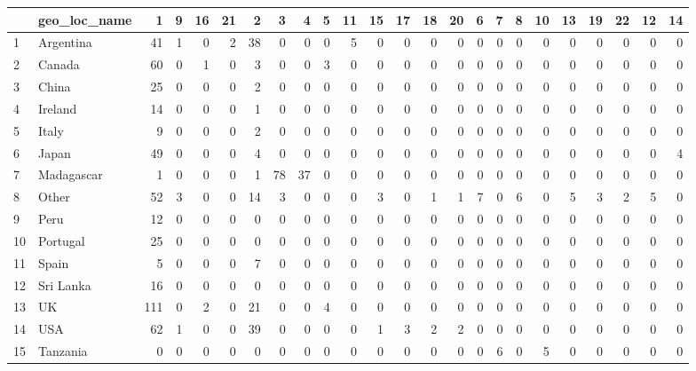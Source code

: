 \begin{table}[ht]
\centering
\begin{tabular}{llrrrrrrrrrrrrrrrrrrrrrr}
  \hline
 & geo\_loc\_name & 1 & 9 & 16 & 21 & 2 & 3 & 4 & 5 & 11 & 15 & 17 & 18 & 20 & 6 & 7 & 8 & 10 & 13 & 19 & 22 & 12 & 14 \\ 
  \hline
1 & Argentina & 41 & 1 & 0 & 2 & 38 & 0 & 0 & 0 & 5 & 0 & 0 & 0 & 0 & 0 & 0 & 0 & 0 & 0 & 0 & 0 & 0 & 0 \\ 
  2 & Canada & 60 & 0 & 1 & 0 & 3 & 0 & 0 & 3 & 0 & 0 & 0 & 0 & 0 & 0 & 0 & 0 & 0 & 0 & 0 & 0 & 0 & 0 \\ 
  3 & China & 25 & 0 & 0 & 0 & 2 & 0 & 0 & 0 & 0 & 0 & 0 & 0 & 0 & 0 & 0 & 0 & 0 & 0 & 0 & 0 & 0 & 0 \\ 
  4 & Ireland & 14 & 0 & 0 & 0 & 1 & 0 & 0 & 0 & 0 & 0 & 0 & 0 & 0 & 0 & 0 & 0 & 0 & 0 & 0 & 0 & 0 & 0 \\ 
  5 & Italy & 9 & 0 & 0 & 0 & 2 & 0 & 0 & 0 & 0 & 0 & 0 & 0 & 0 & 0 & 0 & 0 & 0 & 0 & 0 & 0 & 0 & 0 \\ 
  6 & Japan & 49 & 0 & 0 & 0 & 4 & 0 & 0 & 0 & 0 & 0 & 0 & 0 & 0 & 0 & 0 & 0 & 0 & 0 & 0 & 0 & 0 & 4 \\ 
  7 & Madagascar & 1 & 0 & 0 & 0 & 1 & 78 & 37 & 0 & 0 & 0 & 0 & 0 & 0 & 0 & 0 & 0 & 0 & 0 & 0 & 0 & 0 & 0 \\ 
  8 & Other & 52 & 3 & 0 & 0 & 14 & 3 & 0 & 0 & 0 & 3 & 0 & 1 & 1 & 7 & 0 & 6 & 0 & 5 & 3 & 2 & 5 & 0 \\ 
  9 & Peru & 12 & 0 & 0 & 0 & 0 & 0 & 0 & 0 & 0 & 0 & 0 & 0 & 0 & 0 & 0 & 0 & 0 & 0 & 0 & 0 & 0 & 0 \\ 
  10 & Portugal & 25 & 0 & 0 & 0 & 0 & 0 & 0 & 0 & 0 & 0 & 0 & 0 & 0 & 0 & 0 & 0 & 0 & 0 & 0 & 0 & 0 & 0 \\ 
  11 & Spain & 5 & 0 & 0 & 0 & 7 & 0 & 0 & 0 & 0 & 0 & 0 & 0 & 0 & 0 & 0 & 0 & 0 & 0 & 0 & 0 & 0 & 0 \\ 
  12 & Sri Lanka & 16 & 0 & 0 & 0 & 0 & 0 & 0 & 0 & 0 & 0 & 0 & 0 & 0 & 0 & 0 & 0 & 0 & 0 & 0 & 0 & 0 & 0 \\ 
  13 & UK & 111 & 0 & 2 & 0 & 21 & 0 & 0 & 4 & 0 & 0 & 0 & 0 & 0 & 0 & 0 & 0 & 0 & 0 & 0 & 0 & 0 & 0 \\ 
  14 & USA & 62 & 1 & 0 & 0 & 39 & 0 & 0 & 0 & 0 & 1 & 3 & 2 & 2 & 0 & 0 & 0 & 0 & 0 & 0 & 0 & 0 & 0 \\ 
  15 & Tanzania & 0 & 0 & 0 & 0 & 0 & 0 & 0 & 0 & 0 & 0 & 0 & 0 & 0 & 0 & 6 & 0 & 5 & 0 & 0 & 0 & 0 & 0 \\ 
   \hline
\end{tabular}
\end{table}
